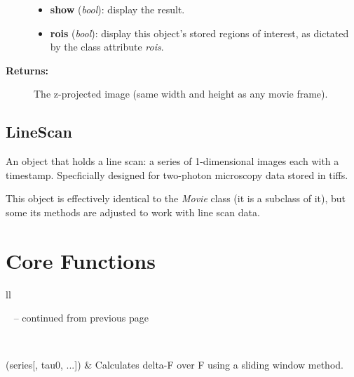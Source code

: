 \documentclass[letterpaper,10pt,english]{sphinxmanual}
\begin{document}
\begin{fulllineitems}
\begin{fulllineitems}
\begin{description}
\begin{itemize}
\item {} 
\textbf{show} (\emph{bool}): display the result.

\item {} 
\textbf{rois} (\emph{bool}): display this object's stored regions of interest, as dictated by the class attribute \emph{rois}.

\end{itemize}

\item[{\textbf{Returns:}}] \leavevmode
The z-projected image (same width and height as any movie frame).

\end{description}

\end{fulllineitems}


\end{fulllineitems}



\section{LineScan}
\label{data_structures:linescan}

\begin{fulllineitems}
\label{data_structures:movies.LineScan}
An object that holds a line scan:  a series of 1-dimensional images each with a timestamp. Specficially designed for two-photon microscopy data stored in tiffs.

This object is effectively identical to the \emph{Movie} class (it is a subclass of it), but some its methods are adjusted to work with line scan data.

\end{fulllineitems}



\chapter{Core Functions}
\label{functions::doc}\label{functions:core-functions}
\begin{longtable}{ll}
\hline
\endfirsthead

%
{{\textsf{\tablename\ \thetable{} -- continued from previous page}}} \\
\hline
\endhead

\hline {} \\ \hline
\endfoot

\endlastfoot


{\hyperref[functions:fluorescence.compute_dff]{}}(series{[}, tau0, ...{]})
 & 
Calculates delta-F over F using a sliding window method.
\\
\hline\end{longtable}
\end{document}
